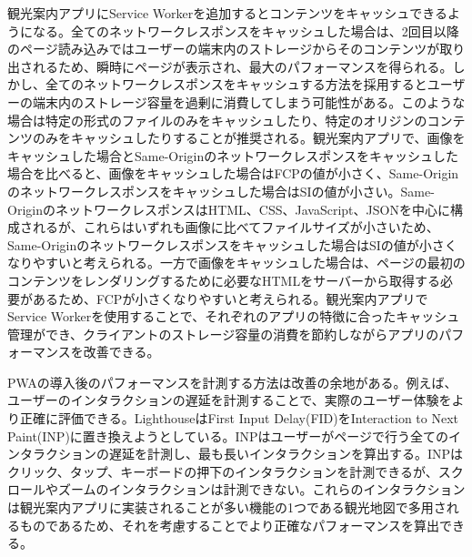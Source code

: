 観光案内アプリにService Workerを追加するとコンテンツをキャッシュできるようになる。全てのネットワークレスポンスをキャッシュした場合は、2回目以降のページ読み込みではユーザーの端末内のストレージからそのコンテンツが取り出されるため、瞬時にページが表示され、最大のパフォーマンスを得られる。しかし、全てのネットワークレスポンスをキャッシュする方法を採用するとユーザーの端末内のストレージ容量を過剰に消費してしまう可能性がある。このような場合は特定の形式のファイルのみをキャッシュしたり、特定のオリジンのコンテンツのみをキャッシュしたりすることが推奨される。観光案内アプリで、画像をキャッシュした場合とSame-Originのネットワークレスポンスをキャッシュした場合を比べると、画像をキャッシュした場合はFCPの値が小さく、Same-Originのネットワークレスポンスをキャッシュした場合はSIの値が小さい。Same-OriginのネットワークレスポンスはHTML、CSS、JavaScript、JSONを中心に構成されるが、これらはいずれも画像に比べてファイルサイズが小さいため、Same-Originのネットワークレスポンスをキャッシュした場合はSIの値が小さくなりやすいと考えられる。一方で画像をキャッシュした場合は、ページの最初のコンテンツをレンダリングするために必要なHTMLをサーバーから取得する必要があるため、FCPが小さくなりやすいと考えられる。観光案内アプリでService Workerを使用することで、それぞれのアプリの特徴に合ったキャッシュ管理ができ、クライアントのストレージ容量の消費を節約しながらアプリのパフォーマンスを改善できる。

PWAの導入後のパフォーマンスを計測する方法は改善の余地がある。例えば、ユーザーのインタラクションの遅延を計測することで、実際のユーザー体験をより正確に評価できる。LighthouseはFirst Input Delay(FID)をInteraction to Next Paint(INP)に置き換えようとしている。INPはユーザーがページで行う全てのインタラクションの遅延を計測し、最も長いインタラクションを算出する。INPはクリック、タップ、キーボードの押下のインタラクションを計測できるが、スクロールやズームのインタラクションは計測できない。これらのインタラクションは観光案内アプリに実装されることが多い機能の1つである観光地図で多用されるものであるため、それを考慮することでより正確なパフォーマンスを算出できる。